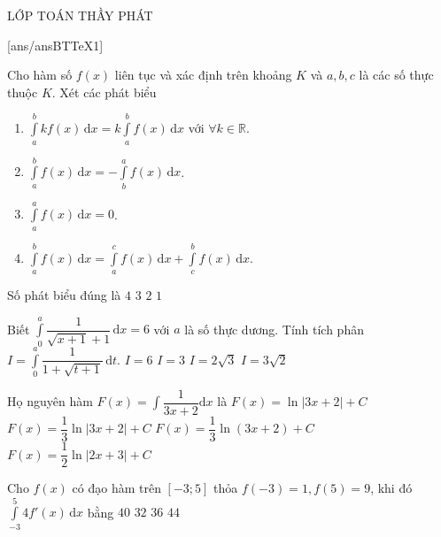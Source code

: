 \begin{name}
	{\tenchude}
	{\tendethi}
	{LỚP TOÁN THẦY PHÁT}
	{\thoigian}
\end{name}
[ans/ansBTTeX1]
\begin{ex}%
Cho hàm số $f(x)$ liên tục và xác định trên khoảng $K$ và $a, b, c$ là các số thực thuộc $K$. Xét các phát biểu
\begin{enumerate}[1)]
\item $\displaystyle\int\limits_{a}^{b}k f(x)\mathrm{\, d}x=k\displaystyle\int\limits_{a}^{b}f(x)\mathrm{\, d}x$ với $\forall k\in \mathbb{R}$.
\item $\displaystyle\int\limits_{a}^{b}f(x)\mathrm{\, d}x=-\displaystyle\int\limits_{b}^{a}f(x)\mathrm{\, d}x$.
\item $\displaystyle\int\limits_{a}^{a}f(x)\mathrm{\, d}x=0$.
\item $\displaystyle\int\limits_{a}^{b}f(x)\mathrm{\, d}x=\displaystyle\int\limits_{a}^{c}f(x)\mathrm{\, d}x+\displaystyle\int\limits_{c}^{b}f(x)\mathrm{\, d}x$.
\end{enumerate}
Số phát biểu đúng là
\choice
{\True $4$}
{$3$}
{$2$}
{$1$}
\end{ex}

\begin{ex}%
Biết $\displaystyle\int\limits_{0}^{a}\dfrac{1}{\sqrt{x+1}+1}\mathrm{\, d}x=6$ với $a$ là số thực dương. Tính tích phân $I=\displaystyle\int\limits_{0}^{a}\dfrac{1}{1+\sqrt{t+1}}\mathrm{\, d}t$.
\choice
{\True $I=6$}
{$I=3$}
{$I=2\sqrt{3}$}
{$I=3\sqrt{2}$}
\end{ex}

\begin{ex}%
Họ nguyên hàm $F(x)=\displaystyle\int\dfrac{1}{3x+2}\mathrm{d}x$ là
\choice
{$F(x)=\ln|3x+2|+C$}
{\True $F(x)=\dfrac{1}{3}\ln|3x+2|+C$}
{$F(x)=\dfrac{1}{3}\ln(3x+2)+C$}
{$F(x)=\dfrac{1}{2}\ln|2x+3|+C$}
\end{ex}

\begin{ex}%
Cho $f(x)$ có đạo hàm trên $[-3; 5]$ thỏa $f(-3)=1, f(5)=9$, khi đó $\displaystyle\int\limits_{-3}^5 4 f'(x)\mathrm{\,d}x$ bằng
\choice
{$40$}
{\True $32$}
{$36$}
{$44$}
\end{ex}

